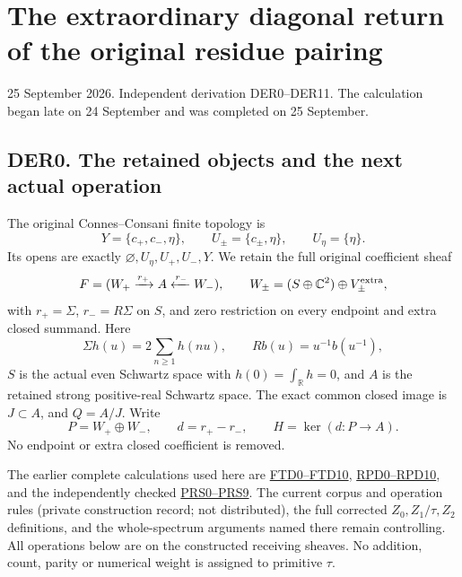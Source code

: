\section{The extraordinary diagonal return of the original residue
pairing}\label{the-extraordinary-diagonal-return-of-the-original-residue-pairing}

25 September 2026. Independent derivation DER0--DER11. The calculation
began late on 24 September and was completed on 25 September.

\subsection{DER0. The retained objects and the next actual
operation}\label{der0.-the-retained-objects-and-the-next-actual-operation}

The original Connes--Consani finite topology is \[
Y=\{c_+,c_-,\eta\},\qquad U_\pm=\{c_\pm,\eta\},\qquad U_\eta=\{\eta\}.
\] Its opens are exactly \(\varnothing,U_\eta,U_+,U_-,Y\). We retain the
full original coefficient sheaf \[
F=(W_+\xrightarrow{r_+}A\xleftarrow{r_-}W_-),\qquad
W_\pm=(S\oplus\mathbb C^2)\oplus V_\pm^{\rm extra},
\] with \(r_+=\Sigma\), \(r_-=R\Sigma\) on \(S\), and zero restriction
on every endpoint and extra closed summand. Here \[
\Sigma h(u)=2\sum_{n\geq1}h(nu),\qquad Rb(u)=u^{-1}b(u^{-1}),
\] \(S\) is the actual even Schwartz space with
\(h(0)=\int_{\mathbb R}h=0\), and \(A\) is the retained strong
positive-real Schwartz space. The exact common closed image is
\(J\subset A\), and \(Q=A/J\). Write \[
P=W_+\oplus W_-,\qquad d=r_+-r_-,\qquad
H=\ker(d:P\to A).
\] No endpoint or extra closed coefficient is removed.

The earlier complete calculations used here are
\href{https://github.com/KokunoYumeto/zeta-function-research-reader/blob/main/workbenches/splitzero-tandem/continuations/20260925-full-source-tensor-and-original-divisor/counterfactual/FINITE_TOPOLOGY_DUALIZING_COMPLEX.md}{FTD0--FTD10},
\href{https://github.com/KokunoYumeto/zeta-function-research-reader/blob/main/workbenches/splitzero-tandem/continuations/20260925-full-source-tensor-and-original-divisor/counterfactual/RESIDUE_PRODUCT_DIAGONAL_INDEPENDENT.md}{RPD0--RPD10},
and the independently checked
\href{https://github.com/KokunoYumeto/zeta-function-research-reader/blob/main/workbenches/splitzero-tandem/continuations/20260925-full-source-tensor-and-original-divisor/counterfactual/ORIGINAL_RESIDUE_PRODUCT_SHEAF_PAIRING.md}{PRS0--PRS9}.
The current corpus and operation rules (private construction record; not
distributed), the full corrected \(Z_0,Z_1/\tau,Z_2\) definitions, and
the whole-spectrum arguments named there remain controlling. All
operations below are on the constructed receiving sheaves. No addition,
count, parity or numerical weight is assigned to primitive \(\tau\).

